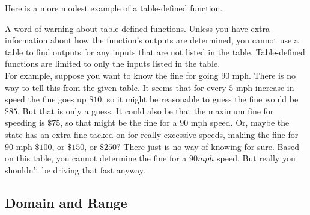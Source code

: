 Here is a more modest example of a table-defined function.



A word of warning about table-defined functions. Unless you have extra information about how the function’s outputs are determined, you cannot use a table to find outputs for any inputs that are not listed in the table. Table-defined functions are limited to only the inputs listed in the table.\\

For example, suppose you want to know the fine for going $90$ mph. There is no way to tell this from the given table. It seems that for every $5$ mph increase in speed the fine goes up $\$10$, so it might be reasonable to guess the fine would be $\$85$. But that is only a guess. It could also be that the maximum fine for speeding is $\$75$, so that might be the fine for a $90$ mph speed. Or, maybe the state has an extra fine tacked on for really excessive speeds, making the fine for $90$ mph $\$100$, or $\$150$, or $\$250$? There just is no way of knowing for sure. Based on this table, you cannot determine the fine for a $90 mph$ speed. But really you shouldn’t be driving that fast anyway.

%
%

\subsection{Domain and Range}

